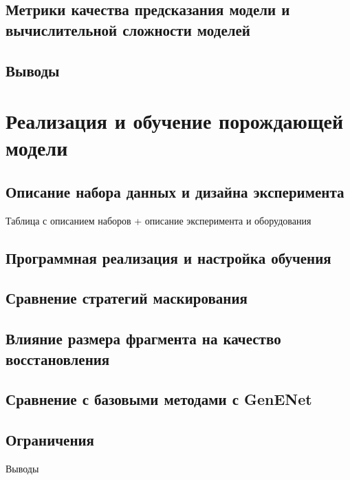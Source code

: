 \documentclass[14pt,a4paper]{extarticle}
\newcommand{\placeholderfigure}[3]{%
  \begin{minipage}[c][#2][c]{#1}
    \centering
    \fbox{\begin{minipage}[c][#2][c]{0.96\linewidth}
      \centering\itshape #3
    \end{minipage}}
  \end{minipage}%
}
\begin{document}
\subsection{Метрики качества предсказания модели и вычислительной сложности моделей}

\subsection{Выводы}

\section{Реализация и обучение порождающей модели}

\subsection{Описание набора данных и дизайна эксперимента}


Таблица с описанием наборов + описание эксперимента и оборудования

\subsection{Программная реализация и настройка обучения}

\subsection{Сравнение стратегий маскирования}


\subsection{Влияние размера фрагмента на качество восстановления}

\subsection{Сравнение с базовыми методами с GenENet}


\subsection{Ограничения}

Выводы

\printbibliography
\end{document}
